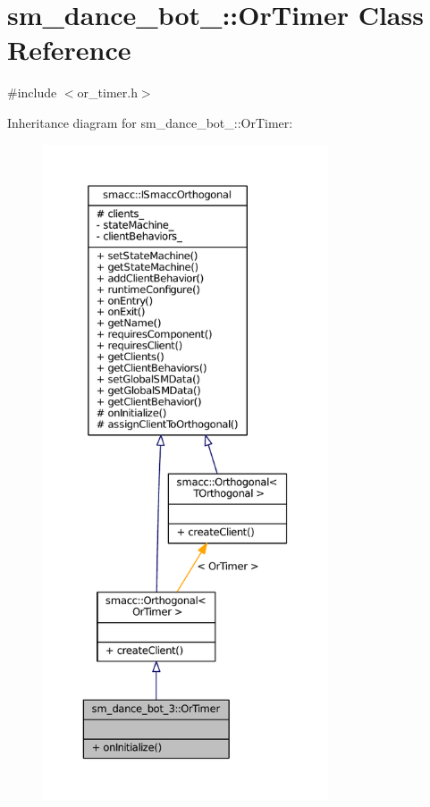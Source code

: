 \hypertarget{classsm__dance__bot__3_1_1OrTimer}{}\section{sm\+\_\+dance\+\_\+bot\+\_\+:\+:Or\+Timer Class Reference}
\label{classsm__dance__bot__3_1_1OrTimer}


{\ttfamily \#include $<$or\+\_\+timer.\+h$>$}



Inheritance diagram for sm\+\_\+dance\+\_\+bot\+\_\+:\+:Or\+Timer\+:
\nopagebreak
\begin{figure}[H]
\begin{center}
\leavevmode
\includegraphics[height=550pt]{classsm__dance__bot__3_1_1OrTimer__inherit__graph}
\end{center}
\end{figure}


